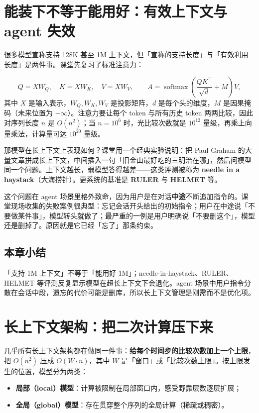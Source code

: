 \documentclass[a4paper]{article}
\begin{document}
\section{能装下不等于能用好：有效上下文与 agent 失效}

很多模型宣称支持 128K 甚至 1M 上下文，但「宣称的支持长度」与「有效利用长度」是两件事。课堂先复习了标准注意力：

$$
Q = XW_Q,\quad K = XW_K,\quad V = XW_V,\qquad
A = \operatorname{softmax}\!\left(\frac{QK^{\top}}{\sqrt{d}} + M\right)V,
$$
其中 $X$ 是输入表示，$W_Q,W_K,W_V$ 是投影矩阵，$d$ 是每个头的维度，$M$ 是因果掩码（未来位置为 $-\infty$）。注意力要让每个 token 与所有历史 token 两两比较，因此对序列长度 $n$ 是 $O(n^2)$；当 $n=10^6$ 时，光比较次数就是 $10^{12}$ 量级，再乘上向量乘法，计算量可达 $10^{20}$ 量级。

那模型在长上下文上表现如何？课堂用一个经典实验说明：把 Paul Graham 的大量文章拼成长上下文，中间插入一句「旧金山最好吃的三明治在哪」，然后问模型同一个问题。上下文越长，弱模型答得越差——这类评测被称为 \textbf{needle in a haystack}（大海捞针）。更系统的基准是 \textbf{RULER} 与 \textbf{HELMET} 等。

这个问题在 agent 场景里格外致命，因为用户是在对话\textbf{中途}不断追加指令的。课堂现场收集的失败案例很典型：忘记会话开头给出的初始指令；用户在中途说「不要做某件事」，模型转头就做了；最严重的一例是用户明确说「不要删这个」，模型还是删掉了。原因就是它已经「忘了」那条约束。

\subsection{本章小结}
「支持 1M 上下文」不等于「能用好 1M」；needle-in-haystack、RULER、HELMET 等评测反复显示模型在超长上下文下会退化。agent 场景中用户指令分散在会话中段，遗忘的代价可能是删库，所以长上下文管理是刚需而不是优化项。

\section{长上下文架构：把二次计算压下来}

几乎所有长上下文架构都在做同一件事：\textbf{给每个时间步的比较次数加上一个上限}，把 $O(n^2)$ 压成 $O(W\cdot n)$，其中 $W$ 是「窗口」或「比较次数上限」。按上限发生的位置，模型分为两类：

\begin{itemize}
\item \textbf{局部（local）模型}：计算被限制在局部窗口内，感受野靠层数逐层扩展；
\item \textbf{全局（global）模型}：存在贯穿整个序列的全局计算（稀疏或稠密）。
\end{itemize}
\end{document}
